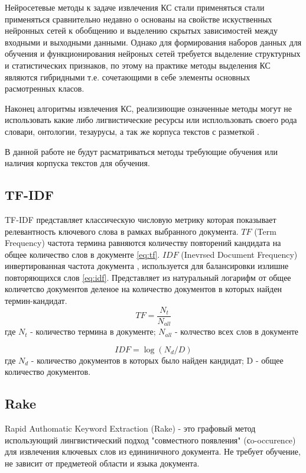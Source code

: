 Нейросетевые методы к задаче извлечения КС стали применяться стали применяться сравнительно недавно о основаны на свойстве искуственных нейронных сетей к обобщению и выделению скрытых зависимостей между входными и выходными данными.
Однако для формирования наборов данных для обучения и функционирования нейроных сетей требуется выделение структурных и статистических признаков, по этому на практике методы выделения КС являются гибридными т.е. сочетающими в себе элементы основных расмотренных класов.

Наконец алгоритмы извлечения КС, реализиющие означенные методы могут не использовать какие либо лигвистические ресурсы или исплользовать своего рода словари, онтологии, тезаурусы, а так же корпуса текстов с разметкой \cite{20}.

В данной работе не будут расматриваться методы требующие обучения или наличия корпуска текстов для обучения.

\subsection{TF-IDF}
TF-IDF представляет классическую числовую метрику которая показывает релевантность ключевого слова в рамках выбранного документа.
$TF$ (Term Frequency) частота термина равняются количеству повторений кандидата на общее количество слов в документе \eqref{eq:tf}.
$IDF$ (Inevrsed Document Frequency) инвертированная частота документа , используется для балансировки излишне повторяющихся слов \eqref{eq:idf}.
Представляет из натуральный логарифм от общее количетсво документов деленое на количество документов в которых найден термин-кандидат.
\begin{equation}
	\label{eq:tf}
	TF = \frac{N_t}{N_{all}}
\end{equation}
где $N_t$ - количество термина в документе; $N_{all}$ - колчество всех слов в документе

\begin{equation}
	\label{eq:idf}
	IDF = \log(N_d / D)
\end{equation}
где $N_d$ - количество документов в которых было найден кандидат; D - общее количество документов.

\subsection{Rake}
Rapid Authomatic Keyword Extraction (Rake) - это графовый метод использующий лингвистический подход "совместного появления" (сo-occurence) для извлечения ключевых слов из едининичного документа.
Не требует обучение, не зависит от предметеой области и языка документа.

